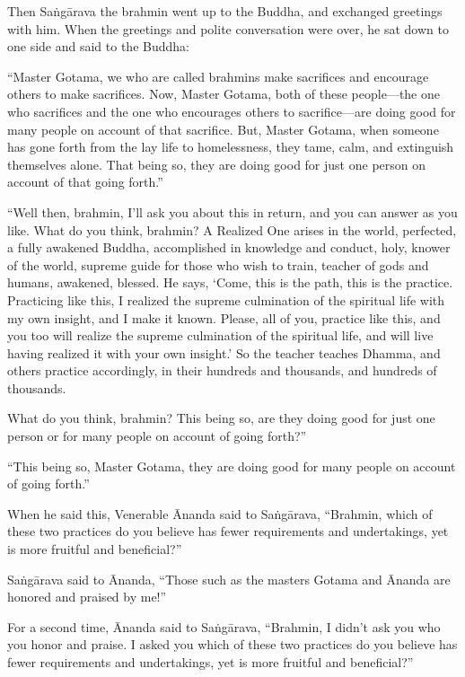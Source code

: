 \documentclass[12pt,openany]{book}%
\begin{document}
Then \textsanskrit{Saṅgārava} the brahmin went up to the Buddha, and exchanged greetings with him. When the greetings and polite conversation were over, he sat down to one side and said to the Buddha: 

“Master Gotama, we who are called brahmins make sacrifices and encourage others to make sacrifices. Now, Master Gotama, both of these people—the one who sacrifices and the one who encourages others to sacrifice—are doing good for many people on account of that sacrifice. But, Master Gotama, when someone has gone forth from the lay life to homelessness, they tame, calm, and extinguish themselves alone. That being so, they are doing good for just one person on account of that going forth.” 

“Well then, brahmin, I’ll ask you about this in return, and you can answer as you like. What do you think, brahmin? A Realized One arises in the world, perfected, a fully awakened Buddha, accomplished in knowledge and conduct, holy, knower of the world, supreme guide for those who wish to train, teacher of gods and humans, awakened, blessed. He says, ‘Come, this is the path, this is the practice. Practicing like this, I realized the supreme culmination of the spiritual life with my own insight, and I make it known. Please, all of you, practice like this, and you too will realize the supreme culmination of the spiritual life, and will live having realized it with your own insight.’ So the teacher teaches Dhamma, and others practice accordingly, in their hundreds and thousands, and hundreds of thousands. 

What do you think, brahmin? This being so, are they doing good for just one person or for many people on account of going forth?” 

“This being so, Master Gotama, they are doing good for many people on account of going forth.” 

When he said this, Venerable Ānanda said to \textsanskrit{Saṅgārava}, “Brahmin, which of these two practices do you believe has fewer requirements and undertakings, yet is more fruitful and beneficial?” 

\textsanskrit{Saṅgārava} said to Ānanda, “Those such as the masters Gotama and Ānanda are honored and praised by me!” 

For a second time, Ānanda said to \textsanskrit{Saṅgārava}, “Brahmin, I didn’t ask you who you honor and praise. I asked you which of these two practices do you believe has fewer requirements and undertakings, yet is more fruitful and beneficial?” 
\end{document}
